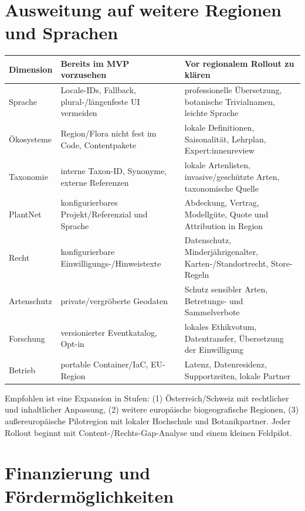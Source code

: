 \documentclass[10pt,a4paper,oneside]{article}
\begin{document}
\section{Ausweitung auf weitere Regionen und Sprachen}

\begin{tabularx}{\textwidth}{@{}p{36mm}X X@{}}
\toprule
\textbf{Dimension} & \textbf{Bereits im MVP vorzusehen} & \textbf{Vor regionalem Rollout zu klären} \\
\midrule
Sprache & Locale-IDs, Fallback, plural-/längenfeste UI vermeiden & professionelle Übersetzung, botanische Trivialnamen, leichte Sprache \\
Ökosysteme & Region/Flora nicht fest im Code, Contentpakete & lokale Definitionen, Saisonalität, Lehrplan, Expert:innenreview \\
Taxonomie & interne Taxon-ID, Synonyme, externe Referenzen & lokale Artenlisten, invasive/geschützte Arten, taxonomische Quelle \\
PlantNet & konfigurierbares Projekt/Referenzial und Sprache & Abdeckung, Vertrag, Modellgüte, Quote und Attribution in Region \\
Recht & konfigurierbare Einwilligungs-/Hinweistexte & Datenschutz, Minderjährigenalter, Karten-/Standortrecht, Store-Regeln \\
Artenschutz & private/vergröberte Geodaten & Schutz sensibler Arten, Betretungs- und Sammelverbote \\
Forschung & versionierter Eventkatalog, Opt-in & lokales Ethikvotum, Datentransfer, Übersetzung der Einwilligung \\
Betrieb & portable Container/IaC, EU-Region & Latenz, Datenresidenz, Supportzeiten, lokale Partner \\
\bottomrule
\end{tabularx}

Empfohlen ist eine Expansion in Stufen: (1) Österreich/Schweiz mit rechtlicher und inhaltlicher Anpassung, (2) weitere europäische biogeografische Regionen, (3) außereuropäische Pilotregion mit lokaler Hochschule und Botanikpartner. Jeder Rollout beginnt mit Content-/Rechts-Gap-Analyse und einem kleinen Feldpilot.

\section{Finanzierung und Fördermöglichkeiten}\label{sec:funding}
\end{document}
